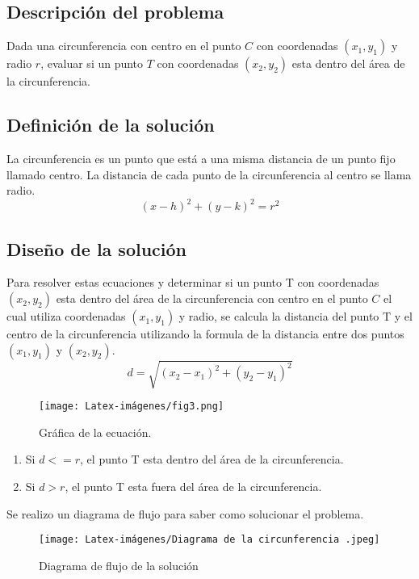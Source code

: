 
\subsection{Descripción del problema}
Dada una circunferencia con centro en el punto $C$ con coordenadas $(x_{1}, y_{1})$ y radio $r$, evaluar si un punto $T$ con coordenadas $(x_{2}, y_{2})$ esta dentro del área de la circunferencia.\\
\subsection{Definición de la solución}
La circunferencia es un punto que está a una misma distancia de un punto fijo llamado centro. 
La distancia de cada punto de la circunferencia al centro se llama radio.
\begin{equation}
    (x-h)^2 + (y-k)^2 =r^2
\end{equation}
\subsection{Diseño de la solución}
Para resolver estas ecuaciones y determinar si un punto T con coordenadas $(x_{2}, y_{2})$ esta dentro del área de la circunferencia con centro en el punto $C$ el cual utiliza coordenadas $(x_{1}, y_{1})$ y radio, se calcula la distancia del punto T y el centro de la circunferencia utilizando la formula de la distancia entre dos puntos $(x_{1}, y_{1})$ y $(x_{2}, y_{2})$.\\
\begin{equation}
 d = \sqrt{{(x_2 - x_1)^2 + (y_2 - y_1)^2}} 
\end{equation}
\begin {figure}[h!]
\centerline{\texttt{[image: Latex-imágenes/fig3.png]}}
\caption{Gráfica de la ecuación.}
\label{fig}
\end {figure}
\begin{enumerate}
    \item Si $d <= r$, el punto T esta dentro del área de la circunferencia.\\
    \item Si $d > r$, el punto T esta fuera del área de la circunferencia.\\
\end{enumerate}
Se realizo un diagrama de flujo para saber como solucionar el problema.\\
\begin {figure}[h!]
\centerline{\texttt{[image: Latex-imágenes/Diagrama de la circunferencia .jpeg]}}
\caption{Diagrama de flujo de la solución}
\label{fig}
\end {figure}
